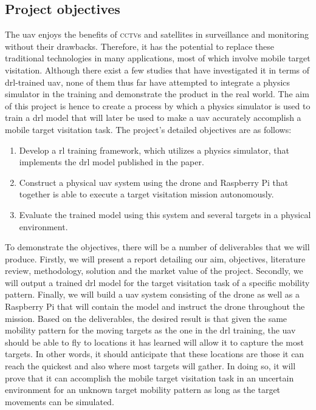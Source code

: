 \documentclass[../main.tex]{subfiles}
\begin{document}

\subsection{Project objectives}\label{sec:objectives}

The \gls{uav} enjoys the benefits of \textsc{cctv}s and satellites
in surveillance and monitoring without their drawbacks.
Therefore, it has the potential to replace these
traditional technologies in many applications, 
most of which involve mobile target visitation. 
Although there exist a few studies 
that have investigated it in terms of \gls{drl}-trained
\gls{uav},
none of them thus far have attempted to
integrate a physics simulator in the training
and demonstrate the product in the real world.
The aim of this project is hence to create a process 
by which a physics simulator is used to train 
a \gls{drl} model that will later be used
to make a \gls{uav} accurately accomplish a
mobile target visitation task.
The project's detailed objectives are as follows:

\begin{enumerate}
    \item Develop a \gls{rl} training framework,
        which utilizes a physics simulator, 
        that implements the \gls{drl} model 
        published in the \textcite{Ged21} paper.
    \item Construct a physical \gls{uav} system 
        using the \anafi drone and 
        Raspberry Pi that together is able to execute
        a target visitation mission autonomously.
    \item Evaluate the trained model using this system
        and several targets in a physical environment.
\end{enumerate}

To demonstrate the objectives, there will be a number 
of deliverables that we will produce.
Firstly, we will present a report detailing
our aim, objectives, literature review, methodology,
solution and the market value of the project.
Secondly, we will output a trained \gls{drl} model for 
the target visitation task of a specific
mobility pattern.
Finally, we will build a \gls{uav} system
consisting of the \anafi drone as well as a Raspberry Pi
that will contain the model and instruct
the \anafi drone throughout the mission.
Based on the deliverables, the desired result is that
given the same mobility pattern for 
the moving targets as the one in the \gls{drl} training,
the \gls{uav} should be able to fly to locations it has learned
will allow it to capture the most targets. In other words,
it should anticipate that these locations are those it can reach
the quickest and also where most targets will gather.
In doing so, it will prove that it can accomplish 
the mobile target visitation task in an uncertain environment
for an unknown target mobility pattern
as long as the target movements can be simulated.
\end{document}
